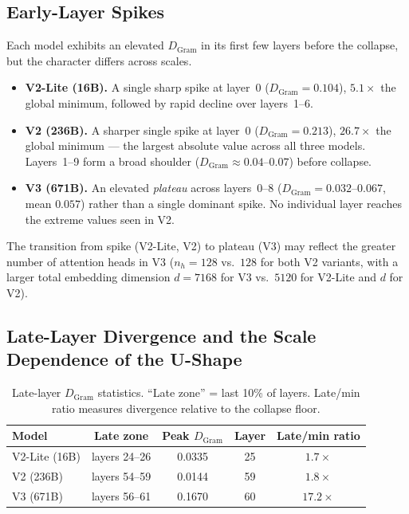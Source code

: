 \subsection{Early-Layer Spikes}
\label{app:early-spikes}

Each model exhibits an elevated $D_\text{Gram}$ in its first few layers
before the collapse, but the character differs across scales.

\begin{itemize}
  \item \textbf{V2-Lite (16B).}
    A single sharp spike at layer~0 ($D_\text{Gram} = 0.104$),
    $5.1\times$ the global minimum, followed by rapid decline over layers~1--6.

  \item \textbf{V2 (236B).}
    A sharper single spike at layer~0 ($D_\text{Gram} = 0.213$),
    $26.7\times$ the global minimum — the largest absolute value across all
    three models.
    Layers~1--9 form a broad shoulder ($D_\text{Gram} \approx 0.04$--$0.07$)
    before collapse.

  \item \textbf{V3 (671B).}
    An elevated \emph{plateau} across layers~0--8
    ($D_\text{Gram} = 0.032$--$0.067$, mean $0.057$) rather than a single
    dominant spike.
    No individual layer reaches the extreme values seen in V2.
\end{itemize}

The transition from spike (V2-Lite, V2) to plateau (V3) may reflect the
greater number of attention heads in V3 ($n_h = 128$ vs.\ $128$ for both V2
variants, with a larger total embedding dimension $d = 7168$ for V3 vs.\
$5120$ for V2-Lite and $d$ for V2). %

\subsection{Late-Layer Divergence and the Scale Dependence of the U-Shape}
\label{app:late-layer}

\begin{table}[h]
\centering
\caption{Late-layer $D_\text{Gram}$ statistics.
  ``Late zone'' = last 10\% of layers.
  Late/min ratio measures divergence relative to the collapse floor.}
\label{tab:late-layer}
\begin{tabular}{lcccc}
\toprule
Model & Late zone & Peak $D_\text{Gram}$ & Layer & Late/min ratio \\
\midrule
V2-Lite (16B) & layers 24--26 & 0.0335 & 25 & $1.7\times$ \\
V2     (236B) & layers 54--59 & 0.0144 & 59 & $1.8\times$ \\
V3     (671B) & layers 56--61 & 0.1670 & 60 & $\mathbf{17.2\times}$ \\
\bottomrule
\end{tabular}
\end{table}

